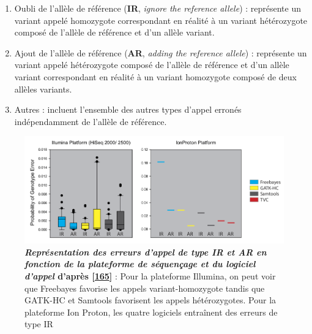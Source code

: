 \documentclass[12pt,a4paper,twoside]{ugathesis}
\theoremstyle{definition}
\theoremstyle{definition}
\theoremstyle{definition}
\theoremstyle{remark}
\begin{document}
\begin{enumerate}
\def\labelenumi{\arabic{enumi}.}
\item
  Oubli de l'allèle de référence (\textbf{IR}, \emph{ignore the
  reference allele}) : représente un variant appelé homozygote
  correspondant en réalité à un variant hétérozygote composé de l'allèle
  de référence et d'un allèle variant.
\item
  Ajout de l'allèle de référence (\textbf{AR}, \emph{adding the
  reference allele}) : représente un variant appelé hétérozygote composé
  de l'allèle de référence et d'un allèle variant correspondant en
  réalité à un variant homozygote composé de deux allèles variants.
\item
  Autres : incluent l'ensemble des autres types d'appel erronés
  indépendamment de l'allèle de référence.
\end{enumerate}

\begin{figure}

{\centering \includegraphics[scale=.37]{figure/snp_error_type} 

}

\caption[Représentation des erreurs d'appel de type IR et AR en fonction de la plateforme de séquençage et du logiciel d'appel]{\textbf{\emph{Représentation des erreurs d'appel de
type IR et AR en fonction de la plateforme de séquençage et du logiciel
d'appel} d'après {[}\protect\hyperlink{ref-Hwang2015}{165}{]}} : Pour la
plateforme Illumina, on peut voir que Freebayes favorise les appels
variant-homozygote tandis que GATK-HC et Samtools favorisent les appels
hétérozygotes. Pour la plateforme Ion Proton, les quatre logiciels
entraînent des erreurs de type IR}\label{fig:pictsnperror}
\end{figure}
\end{document}
